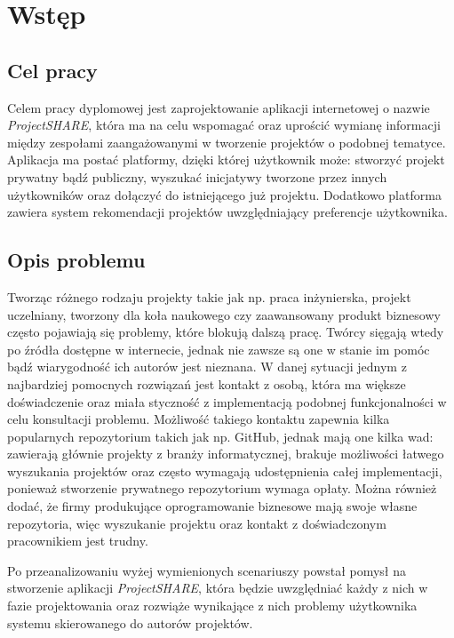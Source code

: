 \chapter{Wstęp}
\label{cha:wstep}

\section{Cel pracy}
\label{sec:celPracy}

Celem pracy dyplomowej jest zaprojektowanie aplikacji internetowej o nazwie \mbox{\textit{ProjectSHARE}}, która ma na celu wspomagać oraz uprościć wymianę informacji między zespołami zaangażowanymi w tworzenie
projektów o podobnej tematyce. Aplikacja ma postać platformy, dzięki której użytkownik
może: stworzyć projekt prywatny bądź publiczny, wyszukać inicjatywy tworzone przez
innych użytkowników oraz dołączyć do istniejącego już projektu. Dodatkowo platforma zawiera system rekomendacji projektów uwzględniający preferencje użytkownika.

\section{Opis problemu}
\label{sec:opisProblemu}
Tworząc różnego rodzaju projekty takie jak np. praca inżynierska, projekt uczelniany, tworzony dla koła naukowego czy zaawansowany produkt biznesowy często pojawiają się
problemy, które blokują dalszą pracę. Twórcy sięgają wtedy po źródła dostępne w
internecie, jednak nie zawsze są one w stanie im pomóc bądź wiarygodność ich autorów jest
nieznana. W danej sytuacji jednym z najbardziej pomocnych rozwiązań jest kontakt z osobą, która ma większe doświadczenie oraz miała styczność z implementacją podobnej
funkcjonalności w celu konsultacji problemu. Możliwość takiego kontaktu zapewnia kilka
popularnych repozytorium takich jak np. GitHub, jednak mają one kilka wad: zawierają głównie
projekty z branży informatycznej, brakuje możliwości łatwego wyszukania projektów oraz często
wymagają udostępnienia całej implementacji, ponieważ stworzenie prywatnego
repozytorium wymaga opłaty. Można również dodać, że firmy produkujące oprogramowanie
biznesowe mają swoje własne repozytoria, więc wyszukanie projektu oraz kontakt z
doświadczonym pracownikiem jest trudny. 


Po przeanalizowaniu wyżej wymienionych scenariuszy powstał pomysł na stworzenie aplikacji         
\mbox{\textit{ProjectSHARE}}, która będzie uwzględniać każdy z nich w fazie projektowania oraz rozwiąże wynikające z nich problemy użytkownika systemu skierowanego do autorów projektów.


